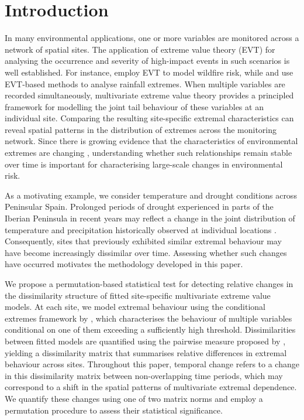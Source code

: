 \documentclass[APA,STIX1COL]{WileyNJD-v2}
\begin{document}
\section{Introduction}
\label{sec:intro}

In many environmental applications, one or more variables are monitored across a network of spatial sites. The application of extreme value theory (EVT) for analysing the occurrence and severity of high-impact events in such scenarios is well established. For instance, \cite{Koh2023} employ EVT to model wildfire risk, while \cite{osei2021estimation} and \cite{Rohrbeck2021} use EVT-based methods to analyse rainfall extremes. When multiple variables are recorded simultaneously, multivariate extreme value theory provides a principled framework for modelling the joint tail behaviour of these variables at an individual site. Comparing the resulting site-specific extremal characteristics can reveal spatial patterns in the distribution of extremes across the monitoring network. Since there is growing evidence that the characteristics of environmental extremes are changing \citep{IPCC2021}, understanding whether such relationships remain stable over time is important for characterising large-scale changes in environmental risk. 

As a motivating example, we consider temperature and drought conditions across Peninsular Spain. Prolonged periods of drought experienced in parts of the Iberian Peninsula in recent years may reflect a change in the joint distribution of temperature and precipitation historically observed at individual locations \citep{jimenez2020impact, sanchez2025one}. Consequently, sites that previously exhibited similar extremal behaviour may have become increasingly dissimilar over time. Assessing whether such changes have occurred motivates the methodology developed in this paper.

We propose a permutation-based statistical test for detecting relative changes in the dissimilarity structure of fitted site-specific multivariate extreme value models. At each site, we model extremal behaviour using the conditional extremes framework by \citet{Heffernan2004}, which characterises the behaviour of multiple variables conditional on one of them exceeding a sufficiently high threshold. Dissimilarities between fitted models are quantified using the pairwise measure proposed by \cite{OToole2026clustering}, yielding a dissimilarity matrix that summarises relative differences in extremal behaviour across sites. Throughout this paper, temporal change refers to a change in this dissimilarity matrix between non-overlapping time periods, which may correspond to a shift in the spatial patterns of multivariate extremal dependence. We quantify these changes using one of two matrix norms and employ a permutation procedure to assess their statistical significance. 
\end{document}
